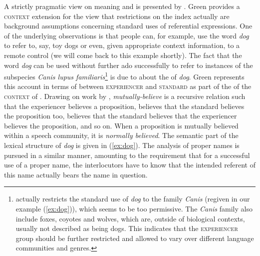 \documentclass[output=paper
 	        ,biblatex
                ,babelshorthands
                ,newtxmath
                ,draftmode
                ,colorlinks, citecolor=brown
]{langscibook}
\begin{document}
A strictly pragmatic view on meaning and  is presented by \citet{Green:1996}.
%
Green provides a \textsc{context} extension for the view that restrictions on the index actually are background assumptions concerning standard uses of referential expressions.
%
One of the underlying observations is that people can, for example, use the word \textit{dog} to refer to, say, toy dogs or even, given appropriate context information, to a remote control (we will come back to this example shortly).
%
The fact that the word \textit{dog} can be used without further ado successfully to refer to instances of the subspecies \textit{Canis lupus familiaris}\footnote{\label{fn:canis}\citet[Example (73)]{Green:1996} actually restricts the standard use of \textit{dog} to the family \textit{Canis} (regiven in our example (\ref{ex:dog})), which seems to be too permissive. The \textit{Canis} family also include foxes, coyotes and wolves, which are, outside of biological contexts, usually not described as being dogs. This indicates that the \textsc{experiencer} group should be further restricted and allowed to vary over different language communities and genres.} is due to  about the  of \textit{dog}.
%
Green represents this account in terms of  between \textsc{experiencer} and \textsc{standard} as part of the  of the \textsc{context} of .
%
Drawing on work by \citet{Cohen:Levesque:1990},  \textit{mutually-believe} is a recursive relation such that the experiencer believes a proposition, believes that the standard believes the proposition too, believes that the standard believes that the experiencer believes the proposition, and so on. 
%
When a proposition is mutually believed within a speech community, it is \emph{normally believed}.
%
The semantic part of the lexical structure of \textit{dog} is given in (\ref{ex:dog}).
%
The analysis of proper names is pursued in a similar manner, amounting to the requirement that for a successful use of a proper name, the interlocutors have to know that the intended referent of this name actually bears the name in question.
%
\ea  \label{ex:dog}
\z
\end{document}
